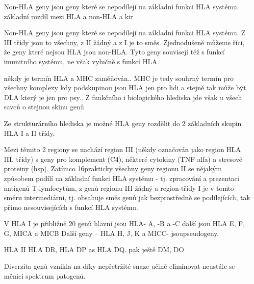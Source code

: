 \documentclass[czech,DP]{thesiskiv}
\begin{document}
Non-HLA geny jsou geny které se nepodílejí na základní funkci HLA systému.
\\základní rozdíl mezi HLA a non-HLA a kir

Non-HLA geny jsou geny které se nepodílejí na základní funkci HLA systému. Z III třídy jsou to všechny, z II žádný a z I je to směs. Zjednodušeně můžeme říci, že geny které nejsou HLA jsou non-HLA. Tyto geny souvisejí též s funkcí imunitního systému, ne však vylučně s funkcí HLA. 


někdy je termín HLA a MHC zaměňován.. MHC je tedy souhrný termín pro všechny komplexy kdy podskupinou jsou HLA jen pro lidi a stejně tak může být DLA který je jen pro psy.. 
Z funkčního i biologického hlediska jde však u všech savců o stejnou skinu genů

Ze strukturárního hlediska je možné HLA geny rozdělit do 2 základních skupin HLA I a II třídy.




Mezi těmito 2 regiony se nachází region III (někdy
označován jako region HLA III. třídy) s geny pro komplement
(C4), některé cytokiny (TNF alfa) a stresové proteiny (hsp). Zatímco
16prakticky všechny geny regionu II se nějakým způsobem podílí na
základní funkci HLA systému - tj. zpracování a prezentaci
antigenů T-lymfocytům, z genů regionu III žádný a region třídy I je
v tomto směru intermediární, tj. obsahuje směs genů jak
bezprostředně se podílejících, tak přímo nesouvisejících s funkcí
HLA systému.

V HLA I je přibližně 20 genů hlavní jsou HLA- A, -B a -C
další jsou HLA E, F, G, MICA a MICB
Další geny – HLA H, J, K a MICC- jsoupseudogeny.

HLA II HLA
DR, HLA DP as HLA DQ.
pak ještě DM, DO

Diverzita genů vznikla na díky nepřetržité snaze učině eliminovat neustále se měnící spektrum patogenů.
\end{document}
